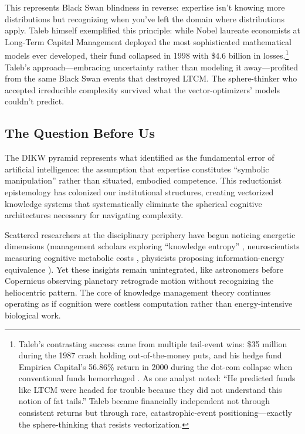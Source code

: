 This represents \citet{taleb2007} Black Swan blindness in reverse: expertise isn't knowing more distributions but recognizing when you've left the domain where distributions apply. Taleb himself exemplified this principle: while Nobel laureate economists at Long-Term Capital Management deployed the most sophisticated mathematical models ever developed, their fund collapsed in 1998 with \$4.6 billion in losses.\footnote{Taleb's contrasting success came from multiple tail-event wins: \$35 million during the 1987 crash holding out-of-the-money puts, and his hedge fund Empirica Capital's 56.86\% return in 2000 during the dot-com collapse when conventional funds hemorrhaged \citep{taleb2001,lowenstein2000}. As one analyst noted: ``He predicted funds like LTCM were headed for trouble because they did not understand this notion of fat tails.'' Taleb became financially independent not through consistent returns but through rare, catastrophic-event positioning—exactly the sphere-thinking that resists vectorization.} Taleb's approach—embracing uncertainty rather than modeling it away—profited from the same Black Swan events that destroyed LTCM. The sphere-thinker who accepted irreducible complexity survived what the vector-optimizers' models couldn't predict.

\subsection{The Question Before Us}

The DIKW pyramid represents what \citet{dreyfus1979} identified as the fundamental error of artificial intelligence: the assumption that expertise constitutes ``symbolic manipulation'' rather than situated, embodied competence. This reductionist epistemology has colonized our institutional structures, creating vectorized knowledge systems that systematically eliminate the spherical cognitive architectures necessary for navigating complexity.

Scattered researchers at the disciplinary periphery have begun noticing energetic dimensions (management scholars exploring ``knowledge entropy'' \citep{bratianu2020}, neuroscientists measuring cognitive metabolic costs \citep{wiehler2022}, physicists proposing information-energy equivalence \citep{stonier1996}). Yet these insights remain unintegrated, like astronomers before Copernicus observing planetary retrograde motion without recognizing the heliocentric pattern. The core of knowledge management theory continues operating as if cognition were costless computation rather than energy-intensive biological work.

